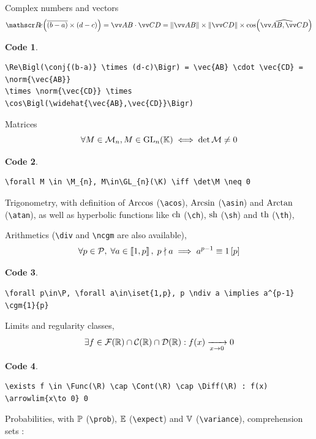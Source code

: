 \documentclass{course}
\theoremstyle{unnumbered}
\newtheorem{code}{Code}
\begin{document}
\vspace{1em}\noindent Complex numbers and vectors
\[
	\Re\Bigl(\conj{(b-a)} \times (d-c)\Bigr) = \vec{AB} \cdot \vec{CD} = \norm{\vec{AB}} \times \norm{\vec{CD}} \times \cos\Bigl(\widehat{\vec{AB},\vec{CD}}\Bigr)
\]

\begin{code}
	\begin{lstlisting}
\Re\Bigl(\conj{(b-a)} \times (d-c)\Bigr) = \vec{AB} \cdot \vec{CD} = \norm{\vec{AB}}
\times \norm{\vec{CD}} \times \cos\Bigl(\widehat{\vec{AB},\vec{CD}}\Bigr)
\end{lstlisting}
\end{code}

\noindent Matrices
\[
	\forall M \in \mathcal{M}_{n}, M\in\mathrm{GL}_{n}(\mathbb{K}) \iff \det\mathcal{M} \neq 0
\]
\begin{code}
	\begin{lstlisting}
\forall M \in \M_{n}, M\in\GL_{n}(\K) \iff \det\M \neq 0
\end{lstlisting}
\end{code}

\vspace{1em}\noindent Trigonometry, with definition of $\operatorname{Arccos}$ (\lstinline|\acos|), $\operatorname{Arcsin}$ (\lstinline|\asin|) and $\operatorname{Arctan}$ (\lstinline|\atan|), as well as hyperbolic functions like $\operatorname{ch}$ (\lstinline|\ch|), $\operatorname{sh}$ (\lstinline|\sh|) and $\operatorname{th}$ (\lstinline|\th|),

\vspace{1em}\noindent Arithmetics (\lstinline|\div| and \lstinline|\ncgm| are also available),
\[
	\forall p\in\mathcal{P},\; \forall a\in\left\llbracket 1,p \right\rrbracket,\; p \nmid a \implies a^{p-1} \equiv 1 \left[p\right]
\]
\begin{code}
	\begin{lstlisting}
\forall p\in\P, \forall a\in\iset{1,p}, p \ndiv a \implies a^{p-1} \cgm{1}{p}
\end{lstlisting}
\end{code}

\vspace{1em}\noindent Limits and regularity classes,
\[
	\exists f \in \mathcal{F}(\mathbb{R}) \cap \mathcal{C}(\mathbb{R}) \cap \mathcal{D}(\mathbb{R}) : f(x) \xrightarrow[x\to 0]{} 0
\]
\begin{code}
	\begin{lstlisting}
\exists f \in \Func(\R) \cap \Cont(\R) \cap \Diff(\R) : f(x) \arrowlim{x\to 0} 0
\end{lstlisting}
\end{code}

\vspace{1em}\noindent Probabilities, with $\mathbb P$ (\lstinline|\prob|), $\mathbb E$ (\lstinline|\expect|) and $\mathbb V$ (\lstinline|\variance|), comprehension sets :
\end{document}
